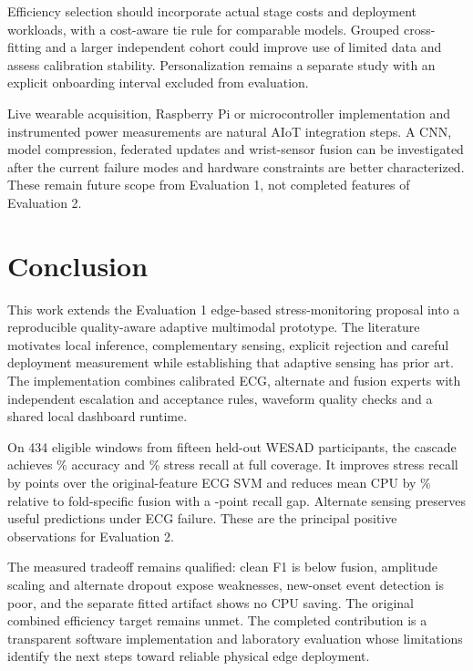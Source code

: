 \documentclass[conference,a4paper]{IEEEtran}
\newcommand{\pct}{\%}
\begin{document}
Efficiency selection should incorporate actual stage costs and deployment workloads, with a cost-aware tie rule for comparable models. Grouped cross-fitting and a larger independent cohort could improve use of limited data and assess calibration stability. Personalization remains a separate study with an explicit onboarding interval excluded from evaluation.

Live wearable acquisition, Raspberry Pi or microcontroller implementation and instrumented power measurements are natural AIoT integration steps. A CNN, model compression, federated updates and wrist-sensor fusion can be investigated after the current failure modes and hardware constraints are better characterized. These remain future scope from Evaluation 1, not completed features of Evaluation 2.

\section{Conclusion}
This work extends the Evaluation 1 edge-based stress-monitoring proposal into a reproducible quality-aware adaptive multimodal prototype. The literature motivates local inference, complementary sensing, explicit rejection and careful deployment measurement while establishing that adaptive sensing has prior art. The implementation combines calibrated ECG, alternate and fusion experts with independent escalation and acceptance rules, waveform quality checks and a shared local dashboard runtime.

On 434 eligible windows from fifteen held-out WESAD participants, the cascade achieves \CascadeAccuracy\pct{} accuracy and \CascadeRecall\pct{} stress recall at full coverage. It improves stress recall by \RecallGain{} points over the original-feature ECG SVM and reduces mean CPU by \CpuSaving\pct{} relative to fold-specific fusion with a \RecallGap{}-point recall gap. Alternate sensing preserves useful predictions under ECG failure. These are the principal positive observations for Evaluation 2.

The measured tradeoff remains qualified: clean F1 is below fusion, amplitude scaling and alternate dropout expose weaknesses, new-onset event detection is poor, and the separate fitted artifact shows no CPU saving. The original combined efficiency target remains unmet. The completed contribution is a transparent software implementation and laboratory evaluation whose limitations identify the next steps toward reliable physical edge deployment.
\end{document}

